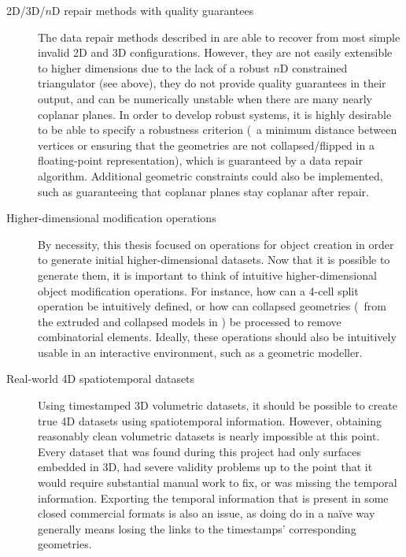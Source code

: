 \begin{description}
\item[2D/3D/$n$D repair methods with quality guarantees] The data repair methods described in  are able to recover from most simple invalid 2D and 3D configurations.
However, they are not easily extensible to higher dimensions due to the lack of a robust $n$D constrained triangulator (see above), they do not provide quality guarantees in their output, and can be numerically unstable when there are many nearly coplanar planes.
In order to develop robust systems, it is highly desirable to be able to specify a robustness criterion (\eg\ a minimum distance between vertices or ensuring that the geometries are not collapsed/flipped in a floating-point representation), which is guaranteed by a data repair algorithm.
Additional geometric constraints could also be implemented, such as guaranteeing that coplanar planes stay coplanar after repair.

\item[Higher-dimensional modification operations] By necessity, this thesis focused on operations for object creation in order to generate initial higher-dimensional datasets.
Now that it is possible to generate them, it is important to think of intuitive higher-dimensional object modification operations.
For instance, how can a 4-cell split operation be intuitively defined, or how can collapsed geometries (\eg\ from the extruded and collapsed models in ) be processed to remove combinatorial elements.
Ideally, these operations should also be intuitively usable in an interactive environment, such as a geometric modeller.

\item[Real-world 4D spatiotemporal datasets] Using timestamped 3D volumetric datasets, it should be possible to create true 4D datasets using spatiotemporal information.
However, obtaining reasonably clean volumetric datasets is nearly impossible at this point.
Every dataset that was found during this project had only surfaces embedded in 3D, had severe validity problems up to the point that it would require substantial manual work to fix, or was missing the temporal information.
Exporting the temporal information that is present in some closed commercial formats is also an issue, as doing do in a naïve way generally means losing the links to the timestamps' corresponding geometries.

\end{description}